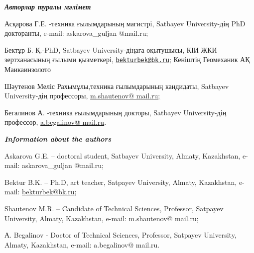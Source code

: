 \begin{authorinfo}
\hspace{1em}\emph{{\bfseries Авторлар туралы мәлімет}}

Асқарова Г.Е. -техника ғылымдарының магистрі, Satbayev University-дің
PhD докторанты, e-mail: askarova\_guljan @mail.ru;

Бектұр Б. Қ.-PhD, Satbayev University-діңаға оқытушысы, КІИ ЖКИ
зертханасының ғылыми қызметкері,
\href{mailto:bekturbek@bk.ru}{\nolinkurl{bekturbek@bk.ru}}; Кеніштің
Геомеханик АҚ Маикаинзолото

Шәутенов Меліс Рахымұлы,техника ғылымдарының кандидаты, Satbayev
University-дің профессоры,
\href{mailto:m.shautenov@satbayev.university}{m.shautenov@ mail.ru;}

Бегалинов А. -техника ғылымдарының докторы, Satbayev University-дің
профессор, \href{mailto:a.begalinov@\%20mail.ru}{a.begalinov@ mail.ru}.

\hspace{1em}\emph{{\bfseries Information about the authors}}

Askarova G.E. -- doctoral student, Satbayev University, Almaty,
Kazakhstan, e-mail: askarova\_guljan @mail.ru;

Bektur B.K. -- Ph.D, art teacher, Satpayev University, Almaty,
Kazakhstan, e-mail: \href{mailto:bekturbek@bk.run}{bekturbek@bk.ru};

Shautenov M.R. -- Candidate of Technical Sciences, Professor, Satpayev
University, Almaty, Kazakhstan, e-mail: m.shautenov@ mail.ru;

А. Begalinov - Doctor of Technical Sciences, Professor, Satpayev
University, Almaty, Kazakhstan, e-mail: a.begalinov@ mail.ru.
\end{authorinfo}
